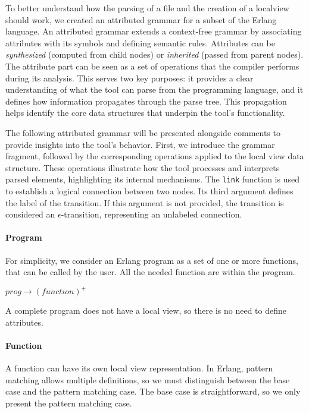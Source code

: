 To better understand how the parsing of a file and the creation of a localview 
should work, we created an attributed grammar for a subset of the Erlang 
language. An attributed grammar extends a context-free grammar by associating 
attributes with its symbols and defining semantic rules. Attributes can be 
\textit{synthesized} (computed from child nodes) or \textit{inherited}
(passed from parent nodes). 
The attribute part can be seen as a set of operations that the compiler  
performs during its analysis. This serves two key purposes: it provides  
a clear understanding of what the tool can parse from the programming  
language, and it defines how information propagates through the parse  
tree. This propagation helps identify the core data structures that  
underpin the tool’s functionality.  

The following attributed grammar will be presented alongside comments  
to provide insights into the tool’s behavior. First, we introduce the  
grammar fragment, followed by the corresponding operations applied  
to the local view data structure. These operations illustrate how the  
tool processes and interprets parsed elements, highlighting its  
internal mechanisms. 
The \texttt{link} function is used to establish a logical connection  
between two nodes. Its third argument defines the label of the transition.  
If this argument is not provided, the transition is considered an  
$\epsilon$-transition, representing an unlabeled connection. 

\paragraph{Program} For simplicity, we consider an Erlang program as a set 
of one or more functions, that can be called by the user. All the needed 
function are within the program.

\bigskip

\noindent $prog \to (function)^+$

A complete program does not have a local view, so there is no need  
to define attributes.  

\paragraph{Function}  
A function can have its own local view representation.  
In Erlang, pattern matching allows multiple definitions,  
so we must distinguish between the base case and the  
pattern matching case. The base case is straightforward,  
so we only present the pattern matching case.  

